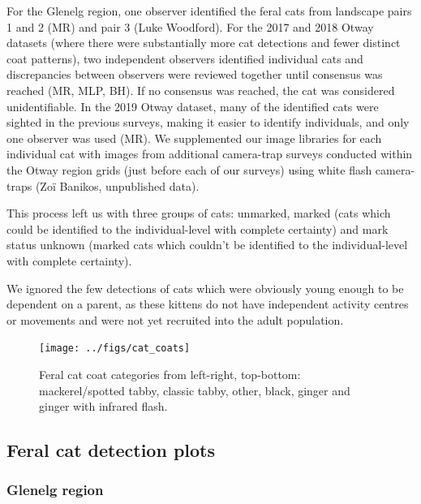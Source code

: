 \documentclass[preprint, 3p, authoryear]{elsarticle} %
\begin{document}
For the Glenelg region, one observer identified the feral cats from landscape pairs 1 and 2 (MR) and pair 3 (Luke Woodford). For the 2017 and 2018 Otway datasets (where there were substantially more cat detections and fewer distinct coat patterns), two independent observers identified individual cats and discrepancies between observers were reviewed together until consensus was reached (MR, MLP, BH). If no consensus was reached, the cat was considered unidentifiable. In the 2019 Otway dataset, many of the identified cats were sighted in the previous surveys, making it easier to identify individuals, and only one observer was used (MR). We supplemented our image libraries for each individual cat with images from additional camera-trap surveys conducted within the Otway region grids (just before each of our surveys) using white flash camera-traps (Zoï Banikos, unpublished data).

This process left us with three groups of cats: unmarked, marked (cats which could be identified to the individual-level with complete certainty) and mark status unknown (marked cats which couldn't be identified to the individual-level with complete certainty).

We ignored the few detections of cats which were obviously young enough to be dependent on a parent, as these kittens do not have independent activity centres or movements and were not yet recruited into the adult population.

\newpage

\begin{figure}

{\centering \texttt{[image: ../figs/cat\_coats]} 

}

\caption{Feral cat coat categories from left-right, top-bottom: mackerel/spotted tabby, classic tabby, other, black, ginger and ginger with infrared flash.}\label{fig:density-cat-photo}
\end{figure}

\newpage

\hypertarget{feral-cat-detection-plots}{%
\subsection{Feral cat detection plots}\label{feral-cat-detection-plots}}

\hypertarget{glenelg-region-1}{%
\subsubsection{Glenelg region}\label{glenelg-region-1}}
\end{document}
